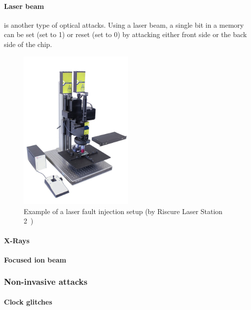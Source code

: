 \paragraph{Laser beam} is another type of optical attacks. Using a laser beam, a single bit in a memory can be set (set to 1) or reset (set to 0) by attacking either front side or the back side of the chip.


\begin{figure}[ht]
    \centering
    \includegraphics[width=0.5\textwidth]{c2_soa/img/LS2.jpeg}
    \caption{Example of a laser fault injection setup (by Riscure Laser Station 2~\cite{riscure_station})}
    \label{fig:ls2}
\end{figure}

\paragraph{X-Rays} \cite{ABCMRT-17-ches, TMZHM-23-iolts, GBD-23-paine}

\paragraph{Focused ion beam}

\subsubsection{Non-invasive attacks}

\paragraph{Clock glitches} 

